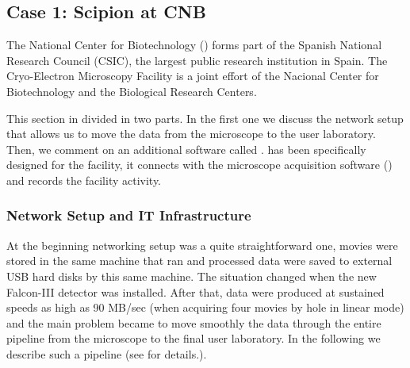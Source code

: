 \subsection{Case 1: Scipion at CNB}
The National Center for Biotechnology (\cnb) forms part of the Spanish National Research Council (CSIC), the largest public research institution in Spain. 
The \cnb Cryo-Electron Microscopy Facility is a joint effort of the Nacional Center for Biotechnology and the Biological Research Centers. %

This section in divided in two parts. In the first one we discuss the network setup that allows us to move the data from the microscope to the user laboratory. Then,  we comment on an additional software called  \emadmin. \emadmin has been specifically designed for the \cnb facility, it connects \scipion with the microscope acquisition software (\epu) and records the facility activity.

\subsubsection{Network Setup and IT Infrastructure}

At the beginning \cnb networking setup was a quite straightforward one, movies were stored in the same machine that ran \scipion and processed data were saved to external USB hard disks by this same machine. The situation changed when the new Falcon-III detector was installed. After that, data were produced at sustained speeds as high as 90 MB/sec (when acquiring four movies by hole in linear mode) and the main problem became to move smoothly the data through the entire pipeline from the microscope to the final user laboratory. In the following we describe such a pipeline (see  for details.).

